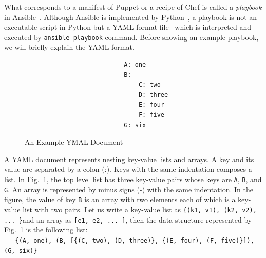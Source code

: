 \documentclass[12pt]{report}
\begin{document}
What corresponds to a manifest of Puppet or a recipe of Chef is called
a {\it playbook} in Ansible~\cite{Ansible}. Although Ansible is
implemented by Python~\cite{Python}, a playbook is not an executable
script in Python but a YAML format file~\cite{YAML} which is
interpreted and executed by {\tt ansible-playbook} command. Before
showing an example playbook, we will briefly explain the YAML format.
\begin{figure}
\small
\begin{verbatim}
                           A: one
                           B:
                             - C: two
                               D: three
                             - E: four
                               F: five
                           G: six
\end{verbatim}
\normalsize
\vspace{-0.6cm}
\caption{An Example YMAL Document}
\label{fig:YAMLExample}
\end{figure}
A YAML document represents nesting key-value lists and arrays. A key
and its value are separated by a colon (:). Keys with the same
indentation composes a list. In Fig.~\ref{fig:YAMLExample}, the top
level list has three key-value pairs whose keys are {\tt A}, {\tt B},
and {\tt G}.  An array is represented by minus signs (-) with the same
indentation.  In the figure, the value of key {\tt B} is an array with
two elements each of which is a key-value list with two pairs. Let us
write a key-value list as
\small\verb|{(k1, v1), (k2, v2), ... }|\normalsize and an array as
\small\verb|[e1, e2, ... ]|\normalsize, then the data structure
represented by Fig.~\ref{fig:YAMLExample} is the following list:
\\\small
\verb|   {(A, one), (B, [{(C, two), (D, three)}, {(E, four), (F, five)}]), (G, six)}|
\normalsize
\end{document}
